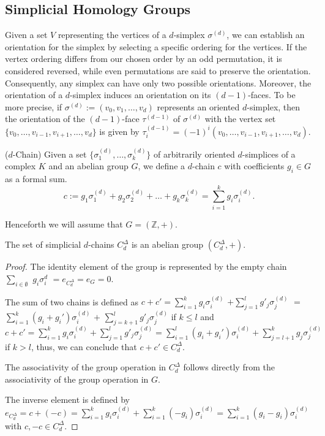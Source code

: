 \subsection{Simplicial Homology Groups}
\label{simplicialhomology} Given a set $V$ representing the vertices of a $d$-simplex
$\sigma^{(d)}$, we can establish an orientation for the simplex by selecting a
specific ordering for the vertices. If the vertex ordering differs from our chosen
order by an odd permutation, it is considered reversed, while even permutations are
said to preserve the orientation. Consequently, any simplex can have only two possible
orientations. Moreover, the orientation of a $d$-simplex induces an orientation on
its $(d-1)$-faces. To be more precise, if $\sigma^{(d)}:= (v_{0}, v_{1}, \ldots,
v_{d})$ represents an oriented $d$-simplex, then the orientation of the $(d-1)$-face
$\tau^{(d-1)}$ of $\sigma^{(d)}$ with the vertex set
$\{v_{0},\ldots,v_{i-1},v_{i+1},\ldots,v_{d}\}$ is given by
$\tau_{i}^{(d-1)}= (-1)^{i} (v_{0}, \ldots,v_{i-1},v_{i+1},\ldots,v_{d})$.

\begin{definition}
	{($d$-Chain) \cite[§2.3]{zomorodian2004computing}} \label{d-chain} Given a set
	$\{\sigma_{1}^{(d)}, \ldots, \sigma_{k}^{(d)}\}$ of arbitrarily oriented $d$-simplices
	of a complex $K$ and an abelian group $G$, we define a $d$-chain $c$ with
	coefficients $g_{i} \in G$ as a formal sum.
	\begin{equation}
		c := g_{1} \sigma^{(d)}_{1} + g_{2} \sigma^{(d)}_{2} + \ldots + g_{k} \sigma^{(d)}
		_{k} = \sum_{i=1}^{k}g_{i} \sigma^{(d)}_{i}.
	\end{equation}
\end{definition}

Henceforth we will assume that $G = (\mathbb{Z},+)$.

\begin{lemma}
	The set of simplicial $d$-chains $C^{\Delta}_{d}$ is an abelian group $(C^{\Delta}
	_{d},+)$.
\end{lemma}
\begin{proof}
	The identity element of the group is represented by the empty chain $\sum_{i
	\in \emptyset}$ $g_{i} \sigma^{d}_{i}$ $= e_{C_d^\Delta}= e_{G} = 0$.

	The sum of two chains is defined as $c+c' = \sum_{i=1}^{k}g_{i} \sigma_{i}^{(d)}$
	$+ \sum_{j=1}^{l}g'_{j} \sigma_{j}^{(d)}$ $=$ $\sum_{i=1}^{k}(g_{i}+g_{i}') \sigma
	_{i}^{(d)}$ $+$ $\sum_{j=k+1}^{l}g'_{j} \sigma_{j}^{(d)}$ if $k \leq l$ and $c+
	c' = \sum_{i=1}^{k}g_{i} \sigma_{i}^{(d)}+ \sum_{j=1}^{l}g'_{j} \sigma_{j}^{(d)}
	= \sum_{i=1}^{l}(g_{i}+g_{i}') \sigma_{i}^{(d)}+ \sum_{j=l+1}^{k}g_{j} \sigma_{j}
	^{(d)}$ if $k > l$, thus, we can conclude that $c+c' \in C^{\Delta}_{d}$.

	The associativity of the group operation in $C^{\Delta}_{d}$ follows directly from
	the associativity of the group operation in $G$.

	The inverse element is defined by $e_{C^\Delta_d}= c + (-c) = \sum_{i=1}^{k}g_{i}
	\sigma_{i}^{(d)}+ \sum_{i=1}^{k}(-g_{i}) \sigma_{i}^{(d)}= \sum_{i=1}^{k}(g_{i}
	-g_{i}) \sigma_{i}^{(d)}$ with $c,-c \in C^{\Delta}_{d}$.
\end{proof}

